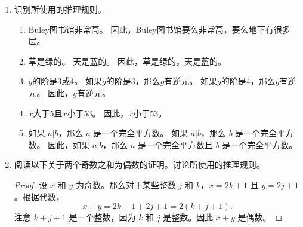 \begin{enumerate}
  \workbookpagebreak
  
  \rule{0pt}{0pt}
  
  \workbookpagebreak
  
  \item 
  识别所使用的推理规则。
  \begin{enumerate}
  \item 
  Buley图书馆非常高。\newline
  因此，Buley图书馆要么非常高，要么地下有很多层。
  \wbvfill
  
  \item 
  草是绿的。\newline
  天是蓝的。\newline
  因此，草是绿的，天是蓝的。
  \wbvfill
  
  \item 
  $g$的阶是3或4。\newline
  如果$g$的阶是3，那么$g$有逆元。\newline
  如果$g$的阶是4，那么$g$有逆元。\newline
  因此，$g$有逆元。
  \wbvfill
  
  \item 
  $x$大于5且$x$小于53。\newline
  因此，$x$小于53。
  
  \wbvfill
  
  \item 
  如果 $a|b$，那么 $a$ 是一个完全平方数。\newline
  如果 $a|b$，那么 $b$ 是一个完全平方数。\newline
  因此，如果 $a|b$，那么 $a$ 是一个完全平方数且 $b$ 是一个完全平方数。
  
  \wbvfill
  
  \end{enumerate}
  
  \workbookpagebreak
  
  \item 
  
  阅读以下关于两个奇数之和为偶数的证明。讨论所使用的推理规则。\\
  \begin{proof}
  
  设 $x$ 和 $y$ 为奇数。那么对于某些整数 $j$ 和 $k$，$x=2k+1$ 且 $y=2j+1$。根据代数，
  \[
  x+y = 2k+1 + 2j+1 = 2(k+j+1).
  \]
  注意 $k+j+1$ 是一个整数，因为 $k$ 和 $j$ 是整数。因此 $x+y$ 是偶数。
  \end{proof}
  

\end{enumerate}
